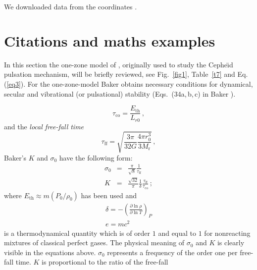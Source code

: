 \documentclass{aa}
\begin{document}
We downloaded data from the coordinates .

\section{Citations and maths examples}

   In this section the one-zone model of \citet{baker},
   originally used to study the Cephe{\"{\i}}d pulsation mechanism, will
   be briefly reviewed, see Fig.~\ref{fig1}, Table~\ref{t7} and Eq. (\ref{eq3}).
   For the one-zone-model Baker obtains necessary conditions
   for dynamical, secular and vibrational (or pulsational)
   stability (Eqs.\ (34a,\,b,\,c) in Baker \citeyear{baker}).
   
   \begin{equation}
   \label{eq1}
      \tau_{\mathrm{co}} = \frac{E_{\mathrm{th}}}{L_{r0}} \,,
   \end{equation}
   and the \emph{local free-fall time}
   \begin{equation}
      \tau_{\mathrm{ff}} =
         \sqrt{ \frac{3 \pi}{32 G} \frac{4\pi r_0^3}{3 M_{\mathrm{r}}}
}\,,
   \end{equation}
   Baker's $K$ and $\sigma_0$ have the following form:
   \begin{eqnarray}
   \label{eq3}
      \sigma_0 & = & \frac{\pi}{\sqrt{8}}
                     \frac{1}{ \tau_{\mathrm{ff}}} \\
      K        & = & \frac{\sqrt{32}}{\pi} \frac{1}{\delta}
                        \frac{ \tau_{\mathrm{ff}} }
                              { \tau_{\mathrm{co}} }\,;
   \end{eqnarray}
   where $ E_{\mathrm{th}} \approx m (P_0/{\rho_0})$ has been used and
   \begin{equation}
   \begin{array}{l}
      \delta = - \left(
                     \frac{ \partial \ln \rho }{ \partial \ln T }
                  \right)_P \\
      e=mc^2
   \end{array}
   \end{equation}
   is a thermodynamical quantity which is of order $1$ and equal to $1$
   for nonreacting mixtures of classical perfect gases. The physical
   meaning of $ \sigma_0 $ and $K$ is clearly visible in the equations
   above. $\sigma_0$ represents a frequency of the order one per
   free-fall time. $K$ is proportional to the ratio of the free-fall
\end{document}
